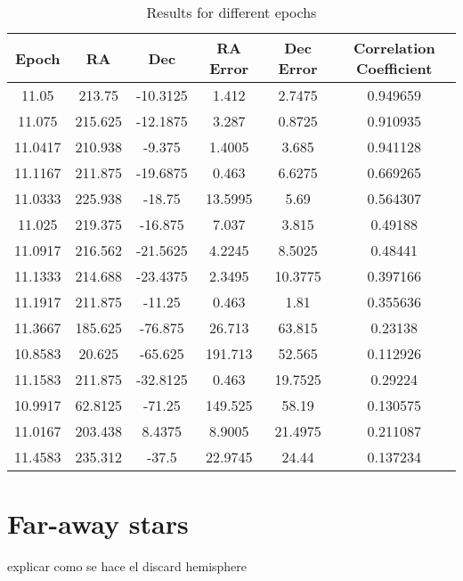 \begin{table}[h!]
	\centering
	\def\arraystretch{1.2}
	\begin{tabular}{|c c c c c c|} 
		\hline
		\textbf{Epoch} & RA & Dec & RA Error & Dec Error & Correlation Coefficient \\ [0.5ex] 
		\hline\hline
		11.05 & 213.75 & -10.3125 & 1.412 & 2.7475 & 0.949659 \\ 
		\hline
		11.075 & 215.625 & -12.1875 & 3.287 & 0.8725 & 0.910935 \\ 
		\hline
		11.0417 & 210.938 & -9.375 & 1.4005 & 3.685 & 0.941128 \\ 
		\hline
		11.1167 & 211.875 & -19.6875 & 0.463 & 6.6275 & 0.669265 \\ 
		\hline
		11.0333 & 225.938 & -18.75 & 13.5995 & 5.69 & 0.564307 \\ 
		\hline
		11.025 & 219.375 & -16.875 & 7.037 & 3.815 & 0.49188 \\ 
		\hline
		11.0917 & 216.562 & -21.5625 & 4.2245 & 8.5025 & 0.48441 \\ 
		\hline
		11.1333 & 214.688 & -23.4375 & 2.3495 & 10.3775 & 0.397166 \\ 
		\hline
		11.1917 & 211.875 & -11.25 & 0.463 & 1.81 & 0.355636 \\ 
		\hline
		11.3667 & 185.625 & -76.875 & 26.713 & 63.815 & 0.23138 \\ 
		\hline
		10.8583 & 20.625 & -65.625 & 191.713 & 52.565 & 0.112926 \\ 
		\hline
		11.1583 & 211.875 & -32.8125 & 0.463 & 19.7525 & 0.29224 \\ 
		\hline
		10.9917 & 62.8125 & -71.25 & 149.525 & 58.19 & 0.130575 \\ 
		\hline
		11.0167 & 203.438 & 8.4375 & 8.9005 & 21.4975 & 0.211087 \\ 
		\hline
		11.4583 & 235.312 & -37.5 & 22.9745 & 24.44 & 0.137234 \\
		\hline
	\end{tabular}
	\caption{Results for different epochs}
\end{table}




\section{Far-away stars}

explicar como se hace el discard hemisphere
